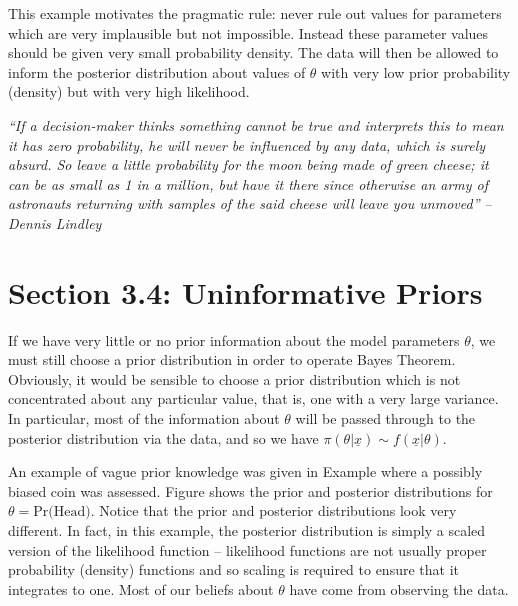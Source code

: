 This example motivates the pragmatic rule:
never rule out values for parameters which are very implausible but not impossible.
Instead these parameter values should be given very small probability density.
The data will then be allowed to inform the posterior distribution about values of $\theta$
with very low prior probability (density) but with very high likelihood.

\begin{tcolorbox}[colback=niceblue, colframe=niceblue]
\noindent \textit{``If a decision-maker thinks something cannot be true and interprets this to mean it has zero probability, he will never be influenced by any data, which is surely absurd. So leave a little probability for the moon being made of green cheese; it can be as small as 1 in a million, but have it there since otherwise an army of astronauts returning with samples of the said cheese will leave you unmoved''} \emph{-- Dennis Lindley}
\end{tcolorbox}

\clearpage
\section{Section 3.4: Uninformative Priors}
If we have very little or no prior information about the model parameters $\theta$, we must still choose a prior distribution in order to operate Bayes Theorem. Obviously, it would be sensible to choose a prior distribution which is not concentrated about any particular value, that is, one with a very large variance. In particular, most of the information about $\theta$ will be passed through to the posterior distribution via the data, and so we have $\pi(\theta|\underline{x})\sim f(\underline{x}|\theta)$.

An example of vague prior knowledge was given in Example  where a possibly biased coin was assessed. Figure  shows the prior and posterior distributions for $\theta=\text{Pr(Head)}$. Notice that the prior and posterior distributions look very different. In fact, in this example, the posterior distribution is simply a scaled version of the likelihood function -- likelihood functions are not usually proper probability (density) functions and so scaling is required to ensure that it integrates to one. Most of our beliefs about $\theta$ have come from observing the data.

